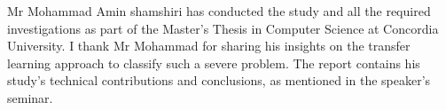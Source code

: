 Mr Mohammad Amin shamshiri has conducted the study and all the required investigations as part of the Master's Thesis in Computer Science at Concordia University. I thank Mr Mohammad for sharing his insights on the transfer learning approach to classify such a severe problem. The report contains his study's technical contributions and conclusions, as mentioned in the speaker's seminar. 